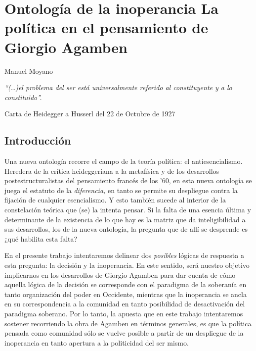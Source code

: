 \chapter{Ontología de la inoperancia La política en el pensamiento de Giorgio Agamben}

Manuel Moyano

\epigraph{\emph{\enquote{(\dots)el problema del ser está universalmente referido al constituyente y a lo constituido}.}}{Carta de Heidegger a Husserl del 22 de Octubre de 1927}

\section{Introducción}

Una nueva ontología recorre el campo de la teoría política: el antiesencialismo. Heredera de la crítica heideggeriana a la metafísica y de los desarrollos postestructuralistas del pensamiento francés de los '60, en esta nueva ontología se juega el estatuto de la \emph{diferencia,} en tanto se permite su despliegue contra la fijación de cualquier esencialismo. Y esto también sucede al interior de la constelación teórica que (se) la intenta pensar. Si la falta de una esencia última y determinante de la existencia de lo que hay es la matriz que da inteligibilidad a sus desarrollos, los de la nueva ontología, la pregunta que de allí se desprende es ¿qué habilita esta falta?

En el presente trabajo intentaremos delinear dos \emph{posibles} lógicas de respuesta a esta pregunta: la decisión y la inoperancia. En este sentido, será nuestro objetivo implicarnos en los desarrollos de Giorgio Agamben para dar cuenta de cómo aquella lógica de la decisión se corresponde con el paradigma de la soberanía en tanto organización del poder en Occidente, mientras que la inoperancia se ancla en su correspondencia a la comunidad en tanto posibilidad de desactivación del paradigma soberano. Por lo tanto, la apuesta que en este trabajo intentaremos sostener recorriendo la obra de Agamben en términos generales, es que la política pensada como comunidad sólo se vuelve posible a partir de un despliegue de la inoperancia en tanto apertura a la politicidad del ser mismo.

